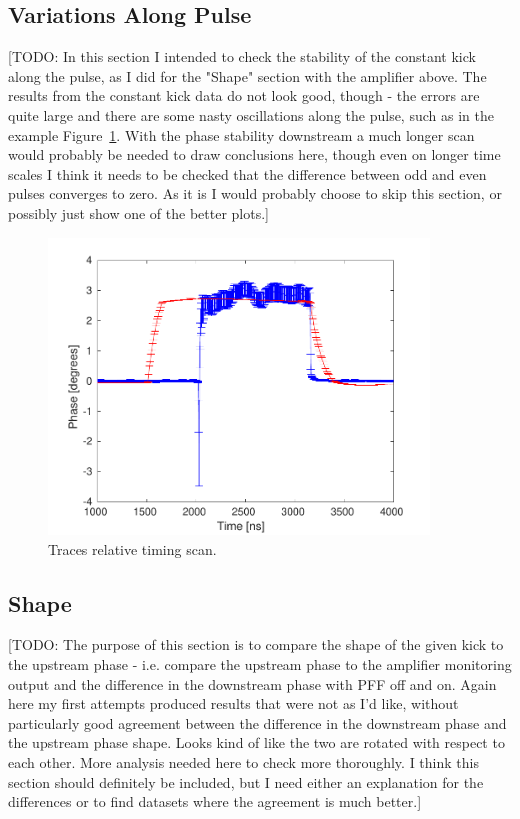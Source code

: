 \subsection{Variations Along Pulse}
\label{ss:kickPulseVar}

[TODO: In this section I intended to check the stability of the constant kick along the pulse, as I did for the "Shape" section with the amplifier above. The results from the constant kick data do not look good, though - the errors are quite large and there are some nasty oscillations along the pulse, such as in the example Figure~\ref{f:phaseShiftAlongConstKick}. With the phase stability downstream a much longer scan would probably be needed to draw conclusions here, though even on longer time scales I think it needs to be checked that the difference between odd and even pulses converges to zero. As it is I would probably choose to skip this section, or possibly just show one of the better plots.]

\begin{figure}
  \centering
  \includegraphics[width=0.9\textwidth]{Figures/commissioning/phaseShiftAlong}
  \caption{Traces relative timing scan.}
  \label{f:phaseShiftAlongConstKick}
\end{figure}

\subsection{Shape}
\label{ss:kickShape}

[TODO: The purpose of this section is to compare the shape of the given kick to the upstream phase - i.e. compare the upstream phase to the amplifier monitoring output and the difference in the downstream phase with PFF off and on. Again here my first attempts produced results that were not as I'd like, without particularly good agreement between the difference in the downstream phase and the upstream phase shape. Looks kind of like the two are rotated with respect to each other. More analysis needed here to check more thoroughly. I think this section should definitely be included, but I need either an explanation for the differences or to find datasets where the agreement is much better.]

